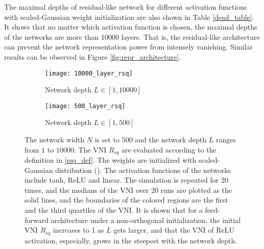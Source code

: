 The maximal depths of residual-like network for different activation functions with scaled-Gaussian
weight initialization are also shown in Table \ref{dead_table}.
It shows that no matter which activation function is chosen, the maximal depths of the networks are
more than 10000 layers. That is, the residual-like architecture can prevent the network representation
power from intensely vanishing. Similar results can be observed in Figure \ref{fig:repr_architecture}.

\begin{figure}[h]
    \centering
    \newcommand{\myWidth}{0.9\textwidth}
    \begin{subfigure}{\myWidth}
      \centering
      \caption{Network depth $L\in[1, 10000]$}
      \texttt{[image: 10000\_layer\_rsq]}
      \label{fig:repr_general_a}
    \end{subfigure}
    
    \begin{subfigure}{\myWidth}
      \centering
      \caption{Network depth $L\in[1, 500]$}
      \texttt{[image: 500\_layer\_rsq]}
      \label{fig:repr_general_b}
    \end{subfigure}%
    \caption[The initial VNI $R_{sq}$ of Gaussian initialized networks.]{
        The network width $N$ is set to $500$ and the network depth $L$ ranges from $1$ to
        $10000$. The VNI $R_{sq}$ are evaluated according to the definition in \eqref{rsq_def}.
        The weights are initialized with scaled-Gaussian distribution (\cite{xavier, he}).
        The activation functions of the networks include tanh, ReLU and linear.
        The simulation is repeated for 20 times, and the medians of the VNI over 20 runs
        are plotted as the solid lines, and the boundaries of the colored regions are the first
        and the third quartiles of the VNI. It is shown that for a feed-forward architecture
        under a non-orthogonal initialization, the initial VNI $R_{sq}$ increases to 1 as $L$
        gets larger, and that the VNI of ReLU activation, especially, grows in the steepest
        with the network depth.
    }
    \label{fig:repr_general}
\end{figure}


